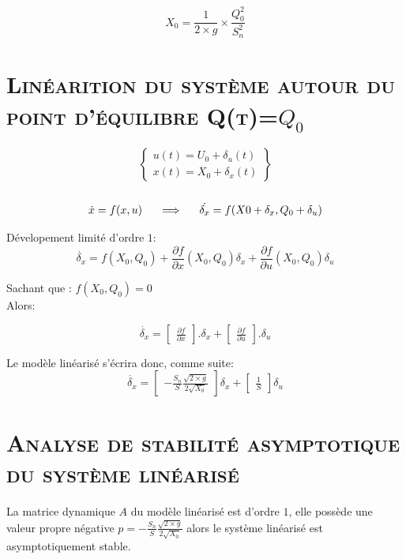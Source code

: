 \[ X_0 = \frac{1}{2 \times g} \times \frac{Q^2_0}{S^2_n} \]


\section{\textsc{Linéarition du système autour du point d'équilibre Q(t)=$Q_0$}}

$$ \left\{
\begin{array}{l}
    u(t)=U_0+\delta_u(t)\\
    x(t)=X_0+\delta_x(t)
\end{array}
\right\} $$\\[0.25 cm]

\[\dot{x}=f(x,u) \indent \Longrightarrow \indent \dot{\delta_x}=f(X0+\delta_x ,Q_0+\delta_u)\]

Dévelopement limité d'ordre $1$:\\

\[\dot{\delta_x}=f(X_0,Q_0)+\frac{\partial f}{ \partial x}(X_0,Q_0)\delta_x + \frac{\partial f}{\partial u}(X_0,Q_0) \delta_u\]

Sachant que : \indent \indent $f(X_0,Q_0)=0$\\
Alors:

\[\dot{\delta_x}=\begin{bmatrix}\frac{\partial f}{ \partial x }\end{bmatrix}.\delta_x + \begin{bmatrix}\frac{\partial f}{\partial u}\end{bmatrix}.\delta_u\]

Le modèle linéarisé s'écrira donc, comme suite:\\

\[\dot{\delta_x}=\begin{bmatrix}-\frac{S_n}{S}\frac{\sqrt{2\times g}}{2\sqrt{X_0}}\end{bmatrix}\delta_x+\begin{bmatrix}\frac{1}{S}\end{bmatrix}\delta_u\]

\section{\textsc{Analyse de stabilité asymptotique du système linéarisé}}

	\par La matrice dynamique $A$ du modèle linéarisé est d'ordre $1$, elle possède une valeur propre négative $p=-\frac{S_n}{S}\frac{\sqrt{2\times g}}{2\sqrt{X_0}}$ alors le système linéarisé est asymptotiquement stable.
	

